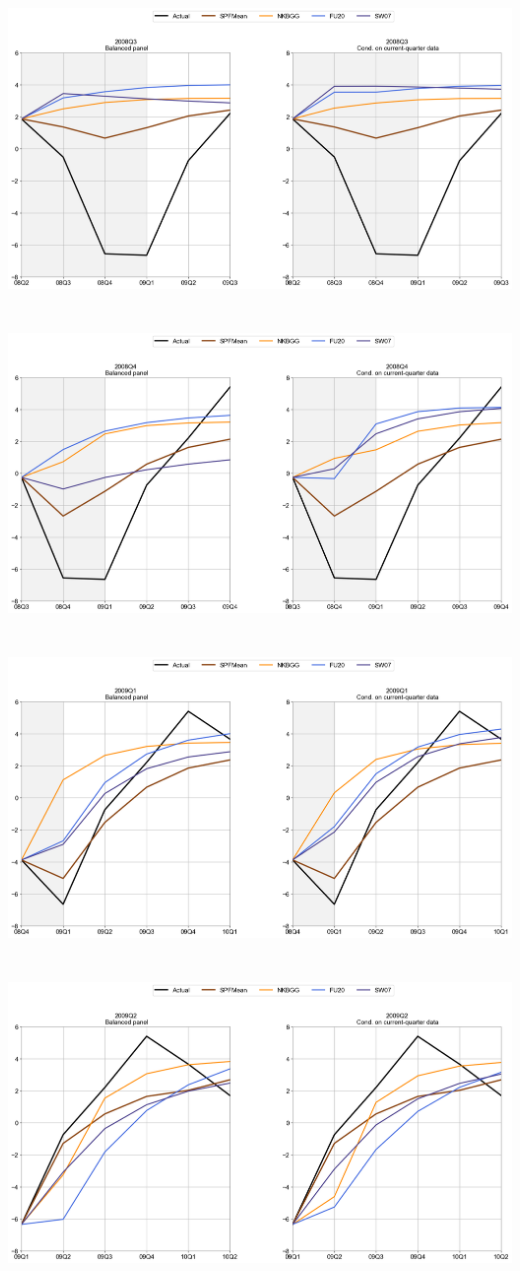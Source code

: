\documentclass{article}
\begin{document}
\includegraphics[scale=0.5]{Top3_models_2008Q3}\\ \bigskip \\ \bigskip  \\
\includegraphics[scale=0.5]{Top3_models_2008Q4}\\  \bigskip \\ \bigskip  \\
\includegraphics[scale=0.5]{Top3_models_2009Q1}\\  \bigskip \\ \bigskip  \\
\includegraphics[scale=0.5]{Top3_models_2009Q2}\\ \bigskip \\ \bigskip  \\
\end{document}
